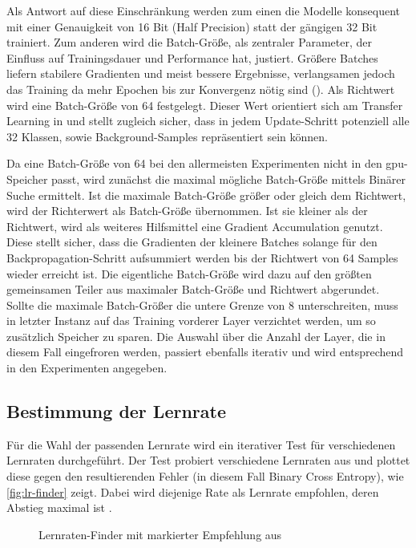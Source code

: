 Als Antwort auf diese Einschränkung werden zum einen die Modelle konsequent mit einer Genauigkeit von 16 Bit (Half Precision) statt der gängigen 32 Bit trainiert.
Zum anderen wird die Batch-Größe, als zentraler Parameter, der Einfluss auf Trainingsdauer und Performance hat, justiert.
Größere Batches liefern stabilere Gradienten und meist bessere Ergebnisse, verlangsamen jedoch das Training da mehr Epochen bis zur Konvergenz nötig sind (\cite{Gugger20}).
Als Richtwert wird eine Batch-Größe von 64 festgelegt.
Dieser Wert orientiert sich am Transfer Learning in \cite{Feichtenhofer18} und stellt zugleich sicher, dass in jedem Update-Schritt potenziell alle 32 Klassen, sowie Background-Samples repräsentiert sein können.

Da eine Batch-Größe von 64 bei den allermeisten Experimenten nicht in den \gls{gpu}-Speicher passt, wird zunächst die maximal mögliche Batch-Größe mittels Binärer Suche ermittelt.
Ist die maximale Batch-Größe größer oder gleich dem Richtwert, wird der Richterwert als Batch-Größe übernommen.
Ist sie kleiner als der Richtwert, wird als weiteres Hilfsmittel eine Gradient Accumulation genutzt.
Diese stellt sicher, dass die Gradienten der kleinere Batches solange für den Backpropagation-Schritt aufsummiert werden bis der Richtwert von 64 Samples wieder erreicht ist.
Die eigentliche Batch-Größe wird dazu auf den größten gemeinsamen Teiler aus maximaler Batch-Größe und Richtwert abgerundet.
Sollte die maximale Batch-Größer die untere Grenze von 8 unterschreiten, muss in letzter Instanz auf das Training vorderer Layer verzichtet werden, um so zusätzlich Speicher zu sparen.
Die Auswahl über die Anzahl der Layer, die in diesem Fall eingefroren werden, passiert ebenfalls iterativ und wird entsprechend in den Experimenten angegeben.


\subsection{Bestimmung der Lernrate}
\label{sec:vorkehrungen}

Für die Wahl der passenden Lernrate wird ein iterativer Test für verschiedenen Lernraten durchgeführt.
Der Test probiert verschiedene Lernraten aus und plottet diese gegen den resultierenden Fehler (in diesem Fall Binary Cross Entropy), wie \autoref{fig:lr-finder} zeigt.
Dabei wird diejenige Rate als Lernrate empfohlen, deren Abstieg maximal ist \cite{Smith15}.

\begin{figure}
    \centering
    \caption{Lernraten-Finder mit markierter Empfehlung aus \cite{Gugger20}}
    \label{fig:lr-finder}
\end{figure}


